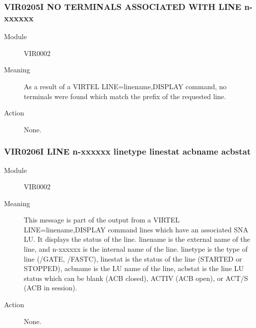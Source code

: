 \documentclass[letterpaper,10pt,english]{sphinxmanual}
\begin{document}
\subsubsection{VIR0205I NO TERMINALS ASSOCIATED WITH LINE n-xxxxxx}
\label{\detokenize{messages:vir0205i-no-terminals-associated-with-line-n-xxxxxx}}\begin{description}
\item[{Module}] \leavevmode
VIR0002

\item[{Meaning}] \leavevmode
As a result of a VIRTEL LINE=linename,DISPLAY command, no terminals were found which match the prefix of the requested line.

\item[{Action}] \leavevmode
None.

\end{description}


\subsubsection{VIR0206I LINE n-xxxxxx linetype linestat acbname acbstat}
\label{\detokenize{messages:vir0206i-line-n-xxxxxx-linetype-linestat-acbname-acbstat}}\begin{description}
\item[{Module}] \leavevmode
VIR0002

\item[{Meaning}] \leavevmode
This message is part of the output from a VIRTEL LINE=linename,DISPLAY command lines which have an associated SNA LU. It displays the status of the line. linename is the external name of the line, and n-xxxxxx is the internal  name of the line. linetype is the type of line (/GATE, /FASTC), linestat is the status of the line (STARTED or STOPPED),
acbname is the LU name of the line, acbstat is the line LU status which can be blank (ACB closed), ACTIV (ACB open), or ACT/S (ACB in session).

\item[{Action}] \leavevmode
None.

\end{description}
\end{document}
